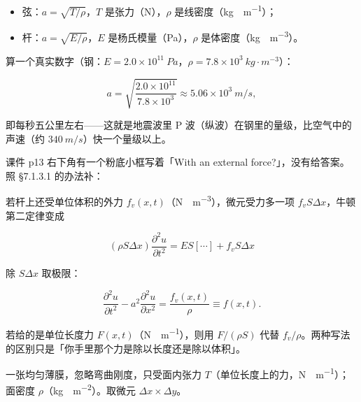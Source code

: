 \begin{itemize}
\item 弦：$a=\sqrt{T/\rho}$，$T$ 是张力（\unit{N}），$\rho$ 是线密度（\unit{kg\cdot m^{-1}}）；
\item 杆：$a=\sqrt{E/\rho}$，$E$ 是杨氏模量（\unit{Pa}），$\rho$ 是体密度（\unit{kg\cdot m^{-3}}）。
\end{itemize}

算一个真实数字（钢：$E=2.0\times10^{11}\ \unit{Pa}$，$\rho=7.8\times10^{3}\ \unit{kg\cdot m^{-3}}$）：

\[
a=\sqrt{\frac{2.0\times10^{11}}{7.8\times10^{3}}}\approx5.06\times10^{3}\ \unit{m/s},
\]

即每秒五公里左右——这就是地震波里 P 波（纵波）在钢里的量级，比空气中的声速（约 $340\ \unit{m/s}$）快一个量级以上。


课件 p13 右下角有一个粉底小框写着「With an external force?」，没有给答案。照 §7.1.3.1 的办法补：

若杆上还受单位体积的外力 $f_v(x,t)$（\unit{N\cdot m^{-3}}），微元受力多一项 $f_vS\Delta x$，牛顿第二定律变成

\[
(\rho S\Delta x)\frac{\partial^2u}{\partial t^2}
=ES\left[\cdots\right]+f_vS\Delta x
\]

除 $S\Delta x$ 取极限：

\[
\frac{\partial^2u}{\partial t^2}-a^2\frac{\partial^2u}{\partial x^2}=\frac{f_v(x,t)}{\rho}\equiv f(x,t).
\]

若给的是单位长度力 $F(x,t)$（\unit{N\cdot m^{-1}}），则用 $F/(\rho S)$ 代替 $f_v/\rho$。两种写法的区别只是「你手里那个力是除以长度还是除以体积」。

\label{sec:715}



一张均匀薄膜，忽略弯曲刚度，只受面内张力 $T$（单位长度上的力，\unit{N\cdot m^{-1}}）；面密度 $\rho$（\unit{kg\cdot m^{-2}}）。取微元 $\Delta x\times\Delta y$。

